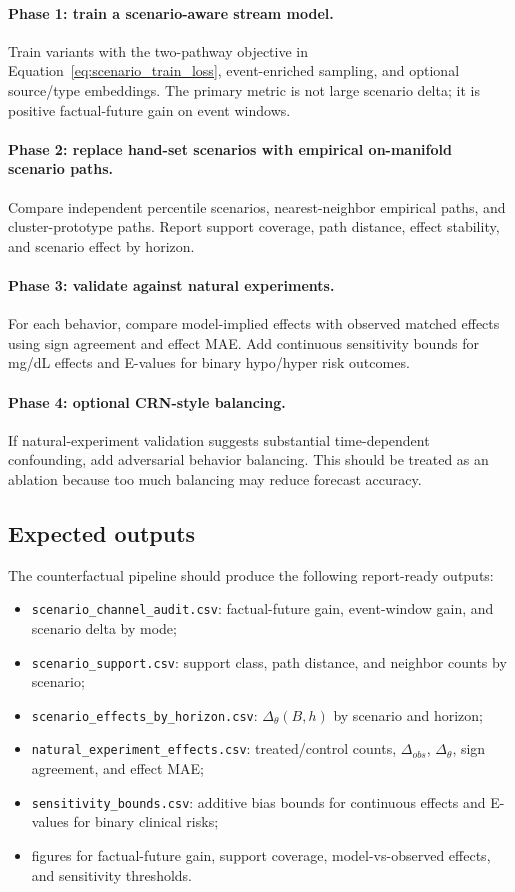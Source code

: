 \paragraph{Phase 1: train a scenario-aware stream model.}
Train variants with the two-pathway objective in Equation~\eqref{eq:scenario_train_loss}, event-enriched sampling, and optional source/type embeddings. The primary metric is not large scenario delta; it is positive factual-future gain on event windows.

\paragraph{Phase 2: replace hand-set scenarios with empirical on-manifold scenario paths.}
Compare independent percentile scenarios, nearest-neighbor empirical paths, and cluster-prototype paths. Report support coverage, path distance, effect stability, and scenario effect by horizon.

\paragraph{Phase 3: validate against natural experiments.}
For each behavior, compare model-implied effects with observed matched effects using sign agreement and effect MAE. Add continuous sensitivity bounds for mg/dL effects and E-values for binary hypo/hyper risk outcomes.

\paragraph{Phase 4: optional CRN-style balancing.}
If natural-experiment validation suggests substantial time-dependent confounding, add adversarial behavior balancing. This should be treated as an ablation because too much balancing may reduce forecast accuracy.

\subsection{Expected outputs}
\label{subsec:cf_expected_outputs}

The counterfactual pipeline should produce the following report-ready outputs:
\begin{itemize}
    \item \texttt{scenario\_channel\_audit.csv}: factual-future gain, event-window gain, and scenario delta by mode;
    \item \texttt{scenario\_support.csv}: support class, path distance, and neighbor counts by scenario;
    \item \texttt{scenario\_effects\_by\_horizon.csv}: $\Delta_\theta(B,h)$ by scenario and horizon;
    \item \texttt{natural\_experiment\_effects.csv}: treated/control counts, $\Delta_{obs}$, $\Delta_\theta$, sign agreement, and effect MAE;
    \item \texttt{sensitivity\_bounds.csv}: additive bias bounds for continuous effects and E-values for binary clinical risks;
    \item figures for factual-future gain, support coverage, model-vs-observed effects, and sensitivity thresholds.
\end{itemize}

